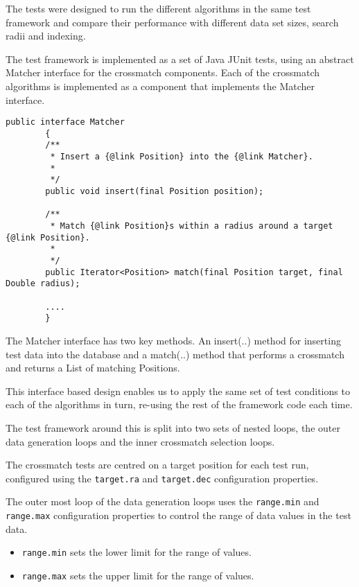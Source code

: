 \documentclass{article}
\newcommand{\junit} {JUnit\xspace}
\newcommand{\crossmatch} {crossmatch\xspace}
\newcommand{\javaname}[1] {{\ttfamily\color{codeblue} #1}}
\newcommand{\javaplural}[1] {\javaname{#1}s}
\begin{document}
The tests were designed to run the different algorithms in the same test framework and compare their performance with different data set sizes, search radii and indexing.

The test framework is implemented as a set of Java \junit tests, using an abstract \javaname{Matcher} interface for the \crossmatch components.
Each of the \crossmatch algorithms is implemented as a component that implements the \javaname{Matcher} interface.

\begin{lstlisting}[style=Java]
    public interface Matcher
        {
        /**
         * Insert a {@link Position} into the {@link Matcher}.
         * 
         */
        public void insert(final Position position);

        /**
         * Match {@link Position}s within a radius around a target {@link Position}.
         * 
         */
        public Iterator<Position> match(final Position target, final Double radius);

        ....
        }
\end{lstlisting}

The \javaname{Matcher} interface has two key methods.
An \javaname{insert(..)} method for inserting test data into the database and a \javaname{match(..)} method that performs a \crossmatch and returns a \javaname{List} of matching \javaplural{Position}.

This interface based design enables us to apply the same set of test conditions to each of the algorithms in turn, re-using the rest of the framework code each time.

\clearpage

The test framework around this is split into two sets of nested loops, the outer data generation loops and the inner \crossmatch selection loops.

The \crossmatch tests are centred on a target position for each test run, configured using the \texttt{target.ra} and \texttt{target.dec} configuration properties.

The outer most loop of the data generation loops uses the \texttt{range.min} and \texttt{range.max} configuration properties to control the range of data values in the test data.
\begin{itemize}
    \item \texttt{range.min} sets the lower limit for the range of values.
    \item \texttt{range.max} sets the upper limit for the range of values.
\end{itemize}
\end{document}
